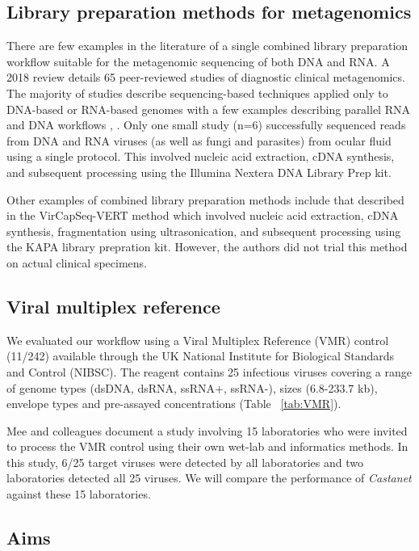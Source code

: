 \subsection{Library preparation methods for metagenomics}
There are few examples in the literature of a single combined library preparation workflow suitable for the metagenomic sequencing of both DNA and RNA. A 2018 review \parencite{Forbes2018} details 65 peer-reviewed studies of diagnostic clinical metagenomics. The majority of studies describe sequencing-based techniques applied only to DNA-based or RNA-based genomes with a few examples describing parallel RNA and DNA workflows \parencite{Langelier2018}, \parencite{Salzberg2016}. Only one small study (n=6) \parencite{Doan2016} successfully sequenced reads from DNA and RNA viruses (as well as fungi and parasites) from ocular fluid using a single protocol. This involved nucleic acid extraction, cDNA synthesis, and subsequent processing using the Illumina Nextera DNA Library Prep kit.

Other examples of combined library preparation methods include that described in the VirCapSeq-VERT method \parencite{Briese2015} which involved nucleic acid extraction, cDNA synthesis, fragmentation using ultrasonication, and subsequent processing using the KAPA library prepration kit. However, the authors did not trial this method on actual clinical specimens. 

\subsection{Viral multiplex reference}
We evaluated our workflow using a Viral Multiplex Reference (VMR) control (11/242) available through the UK National Institute for Biological Standards and Control (NIBSC). The reagent contains 25 infectious viruses covering a range of genome types (dsDNA, dsRNA, ssRNA+, ssRNA-), sizes (6.8-233.7 kb), envelope types and pre-assayed concentrations (Table ~\ref{tab:VMR}). 

Mee and colleagues \parencite{Mee2016} document a study involving 15 laboratories who were invited to process the VMR control using their own wet-lab and informatics methods. In this study, 6/25 target viruses were detected by all laboratories and two laboratories detected all 25 viruses. We will compare the performance of \textit{Castanet} against these 15 laboratories.

\subsection{Aims}

